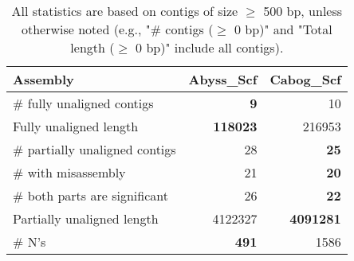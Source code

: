 \documentclass[12pt,a4paper]{article}
\begin{document}
\begin{table}[ht]
\begin{center}
\caption{All statistics are based on contigs of size $\geq$ 500 bp, unless otherwise noted (e.g., "\# contigs ($\geq$ 0 bp)" and "Total length ($\geq$ 0 bp)" include all contigs).}
\begin{tabular}{|l*{2}{|r}|}
\hline
Assembly & Abyss\_Scf & Cabog\_Scf \\ \hline
\# fully unaligned contigs & {\bf 9} & 10 \\ \hline
Fully unaligned length & {\bf 118023} & 216953 \\ \hline
\# partially unaligned contigs & 28 & {\bf 25} \\ \hline
\hspace{5mm}\# with misassembly & 21 & {\bf 20} \\ \hline
\hspace{5mm}\# both parts are significant & 26 & {\bf 22} \\ \hline
Partially unaligned length & 4122327 & {\bf 4091281} \\ \hline
\# N's & {\bf 491} & 1586 \\ \hline
\end{tabular}
\end{center}
\end{table}
\end{document}
